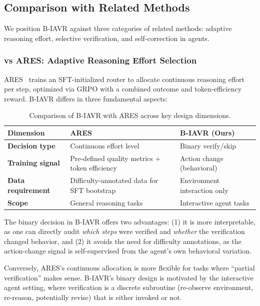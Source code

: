 

\subsection{Comparison with Related Methods}
\label{subsec:comparison}

We position B-IAVR against three categories of related methods: adaptive reasoning effort, selective verification, and self-correction in agents.

\subsubsection{vs ARES: Adaptive Reasoning Effort Selection}

ARES~\cite{yang2026ares} trains an SFT-initialized router to allocate continuous reasoning effort per step, optimized via GRPO with a combined outcome and token-efficiency reward. B-IAVR differs in three fundamental aspects:

\begin{table}[t]
\centering
\caption{Comparison of B-IAVR with ARES across key design dimensions.}
\label{tab:ares-comparison}
\begin{tabular}{lp{3.2cm}p{3.2cm}}
\toprule
\textbf{Dimension} & \textbf{ARES} & \textbf{B-IAVR (Ours)} \\
\midrule
\textbf{Decision type} & Continuous effort level & Binary verify/skip \\
\textbf{Training signal} & Pre-defined quality metrics + token efficiency & Action change (behavioral) \\
\textbf{Data requirement} & Difficulty-annotated data for SFT bootstrap & Environment interaction only \\
\textbf{Scope} & General reasoning tasks & Interactive agent tasks \\
\bottomrule
\end{tabular}
\end{table}

The binary decision in B-IAVR offers two advantages: (1) it is more interpretable, as one can directly audit \textit{which steps} were verified and \textit{whether} the verification changed behavior, and (2) it avoids the need for difficulty annotations, as the action-change signal is self-supervised from the agent's own behavioral variation.

Conversely, ARES's continuous allocation is more flexible for tasks where ``partial verification'' makes sense. B-IAVR's binary design is motivated by the interactive agent setting, where verification is a discrete subroutine (re-observe environment, re-reason, potentially revise) that is either invoked or not.

